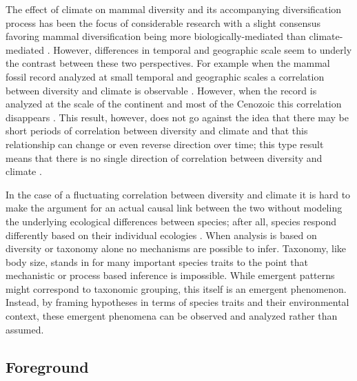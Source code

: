 The effect of climate on mammal diversity and its accompanying diversification process has been the focus of considerable research with a slight consensus favoring mammal diversification being more biologically-mediated than climate-mediated \citep{Alroy2000g,Figueirido2012,Clyde1998a}. However, differences in temporal and geographic scale seem to underly the contrast between these two perspectives. For example when the mammal fossil record analyzed at small temporal and geographic scales a correlation between diversity and climate is observable \citep{Clyde1998a}. However, when the record is analyzed at the scale of the continent and most of the Cenozoic this correlation disappears \citep{Alroy2000g}. This result, however, does not go against the idea that there may be short periods of correlation between diversity and climate and that this relationship can change or even reverse direction over time; this type result means that there is no single direction of correlation between diversity and climate \citep{Figueirido2012}. 

In the case of a fluctuating correlation between diversity and climate it is hard to make the argument for an actual causal link between the two without modeling the underlying ecological differences between species; after all, species respond differently based on their individual ecologies \citep{Blois2009}. When analysis is based on diversity or taxonomy alone no mechanisms are possible to infer. Taxonomy, like body size, stands in for many important species traits to the point that mechanistic or process based inference is impossible. While emergent patterns might correspond to taxonomic grouping, this itself is an emergent phenomenon. Instead, by framing hypotheses in terms of species traits and their environmental context, these emergent phenomena can be observed and analyzed rather than assumed.



\subsection*{Foreground}

